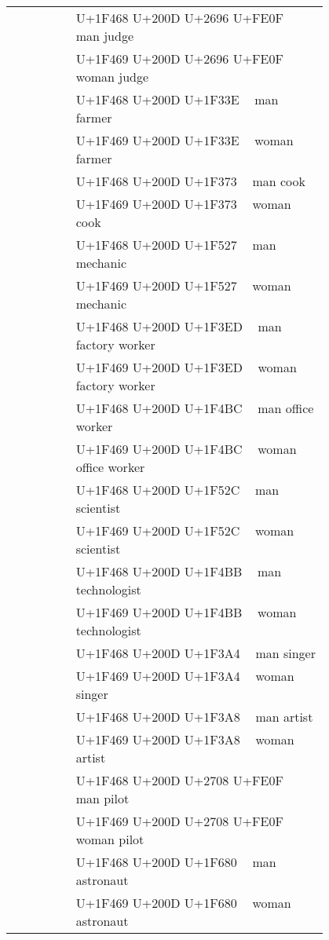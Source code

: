 \documentclass[a4paper,12pt]{article}
\newcommand{\fontA}[1]{{\fontspec[RawFeature={dist,ccmp}]{Segoe UI Emoji} #1}}
\newcommand{\fontB}[1]{{\fontspec[Ligatures=Common,RawFeature={+ccmp}]{Symbola_Hinted.ttf} #1}}
\begin{document}
\begin{longtable}[c]{ccp{0.8\linewidth}}
\fontA{👨‍⚖️}&\fontB{👨‍⚖️}&U+1F468 U+200D U+2696 U+FE0F 👨‍⚖️ man judge\\
\fontA{👩‍⚖️}&\fontB{👩‍⚖️}&U+1F469 U+200D U+2696 U+FE0F 👩‍⚖️ woman judge\\
\fontA{👨‍🌾}&\fontB{👨‍🌾}&U+1F468 U+200D U+1F33E 👨‍🌾 man farmer\\
\fontA{👩‍🌾}&\fontB{👩‍🌾}&U+1F469 U+200D U+1F33E 👩‍🌾 woman farmer\\
\fontA{👨‍🍳}&\fontB{👨‍🍳}&U+1F468 U+200D U+1F373 👨‍🍳 man cook\\
\fontA{👩‍🍳}&\fontB{👩‍🍳}&U+1F469 U+200D U+1F373 👩‍🍳 woman cook\\
\fontA{👨‍🔧}&\fontB{👨‍🔧}&U+1F468 U+200D U+1F527 👨‍🔧 man mechanic\\
\fontA{👩‍🔧}&\fontB{👩‍🔧}&U+1F469 U+200D U+1F527 👩‍🔧 woman mechanic\\
\fontA{👨‍🏭}&\fontB{👨‍🏭}&U+1F468 U+200D U+1F3ED 👨‍🏭 man factory worker\\
\fontA{👩‍🏭}&\fontB{👩‍🏭}&U+1F469 U+200D U+1F3ED 👩‍🏭 woman factory worker\\
\fontA{👨‍💼}&\fontB{👨‍💼}&U+1F468 U+200D U+1F4BC 👨‍💼 man office worker\\
\fontA{👩‍💼}&\fontB{👩‍💼}&U+1F469 U+200D U+1F4BC 👩‍💼 woman office worker\\
\fontA{👨‍🔬}&\fontB{👨‍🔬}&U+1F468 U+200D U+1F52C 👨‍🔬 man scientist\\
\fontA{👩‍🔬}&\fontB{👩‍🔬}&U+1F469 U+200D U+1F52C 👩‍🔬 woman scientist\\
\fontA{👨‍💻}&\fontB{👨‍💻}&U+1F468 U+200D U+1F4BB 👨‍💻 man technologist\\
\fontA{👩‍💻}&\fontB{👩‍💻}&U+1F469 U+200D U+1F4BB 👩‍💻 woman technologist\\
\fontA{👨‍🎤}&\fontB{👨‍🎤}&U+1F468 U+200D U+1F3A4 👨‍🎤 man singer\\
\fontA{👩‍🎤}&\fontB{👩‍🎤}&U+1F469 U+200D U+1F3A4 👩‍🎤 woman singer\\
\fontA{👨‍🎨}&\fontB{👨‍🎨}&U+1F468 U+200D U+1F3A8 👨‍🎨 man artist\\
\fontA{👩‍🎨}&\fontB{👩‍🎨}&U+1F469 U+200D U+1F3A8 👩‍🎨 woman artist\\
\fontA{👨‍✈️}&\fontB{👨‍✈️}&U+1F468 U+200D U+2708 U+FE0F 👨‍✈️ man pilot\\
\fontA{👩‍✈️}&\fontB{👩‍✈️}&U+1F469 U+200D U+2708 U+FE0F 👩‍✈️ woman pilot\\
\fontA{👨‍🚀}&\fontB{👨‍🚀}&U+1F468 U+200D U+1F680 👨‍🚀 man astronaut\\
\fontA{👩‍🚀}&\fontB{👩‍🚀}&U+1F469 U+200D U+1F680 👩‍🚀 woman astronaut\\

\end{longtable}
\end{document}
